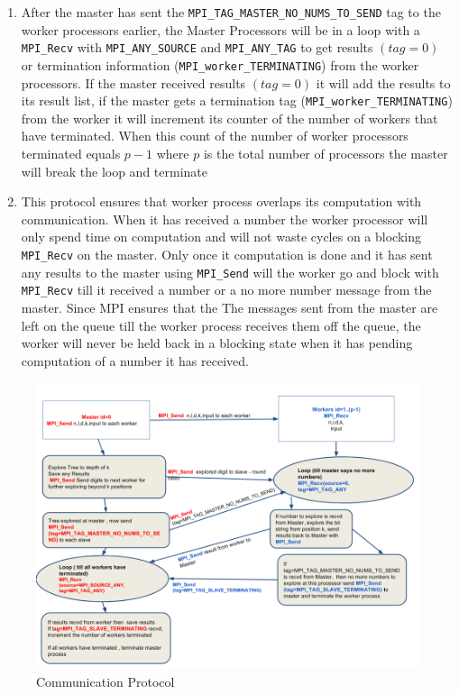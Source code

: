 \documentclass[twoside,11pt]{article}\usepackage{amsmath,amsfonts,amsthm,fullpage}
\begin{document}
\begin{enumerate}
\item
After the master has sent the \verb|MPI_TAG_MASTER_NO_NUMS_TO_SEND| tag to the worker processors earlier, the Master Processors will be in a loop with a \verb|MPI_Recv| with \verb|MPI_ANY_SOURCE| and \verb|MPI_ANY_TAG| to get results $(tag=0)$ or termination information (\verb|MPI_worker_TERMINATING|) from the worker processors. If the master received results $(tag=0)$ it will add the results to its result list, if the master gets a termination tag (\verb|MPI_worker_TERMINATING|) from the worker it will increment its counter of the number of workers that have terminated. When this count of the number of worker processors terminated equals $p-1$ where $p$ is the total number of processors the master will break the loop and terminate
\item
This protocol ensures that worker process overlaps its computation with communication. When it has received a number the worker processor will only spend time on computation and will not waste cycles on a blocking \verb|MPI_Recv| on the master. Only once it computation is done and it has sent any results to the master using \verb|MPI_Send| will the worker go and block with \verb|MPI_Recv| till it received a number or a no more number message from the master. Since MPI ensures that the The messages sent from the master are left on the queue till the worker process receives them off the queue, the worker will never be held back in a blocking state when it has pending computation of a number it has received.
\end{enumerate}




\begin{figure}[!htbp]
\centering
\includegraphics[scale=.46]{images/prog1_communication_protocol} 
\caption{Communication Protocol}
\label{Communication Protocol}
\end{figure}
\end{document}
